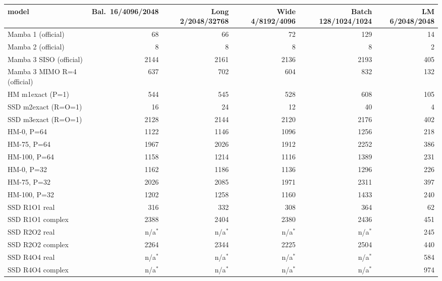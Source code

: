 \begin{tabular}{l r r r r r }
\toprule
model & Bal.\ 16/4096/2048 & Long 2/2048/32768 & Wide 4/8192/4096 & Batch 128/1024/1024 & LM 6/2048/2048 \\
\midrule
Mamba 1 (official) & 68 & 66 & 72 & 129 & 14 \\
Mamba 2 (official) & 8 & 8 & 8 & 8 & 2 \\
Mamba 3 SISO (official) & 2144 & 2161 & 2136 & 2193 & 405 \\
Mamba 3 MIMO R=4 (official) & 637 & 702 & 604 & 832 & 132 \\
HM m1exact (P=1) & 544 & 545 & 528 & 608 & 105 \\
SSD m2exact (R=O=1) & 16 & 24 & 12 & 40 & 4 \\
SSD m3exact (R=O=1) & 2128 & 2144 & 2120 & 2176 & 402 \\
HM-0, P=64 & 1122 & 1146 & 1096 & 1256 & 218 \\
HM-75, P=64 & 1967 & 2026 & 1912 & 2252 & 386 \\
HM-100, P=64 & 1158 & 1214 & 1116 & 1389 & 231 \\
HM-0, P=32 & 1162 & 1186 & 1136 & 1296 & 226 \\
HM-75, P=32 & 2026 & 2085 & 1971 & 2311 & 397 \\
HM-100, P=32 & 1202 & 1258 & 1160 & 1433 & 240 \\
SSD R1O1 real & 316 & 332 & 308 & 364 & 62 \\
SSD R1O1 complex & 2388 & 2404 & 2380 & 2436 & 451 \\
SSD R2O2 real & n/a$^\ast$ & n/a$^\ast$ & n/a$^\ast$ & n/a$^\ast$ & 245 \\
SSD R2O2 complex & 2264 & 2344 & 2225 & 2504 & 440 \\
SSD R4O4 real & n/a$^\ast$ & n/a$^\ast$ & n/a$^\ast$ & n/a$^\ast$ & 584 \\
SSD R4O4 complex & n/a$^\ast$ & n/a$^\ast$ & n/a$^\ast$ & n/a$^\ast$ & 974 \\
\bottomrule
\end{tabular}
